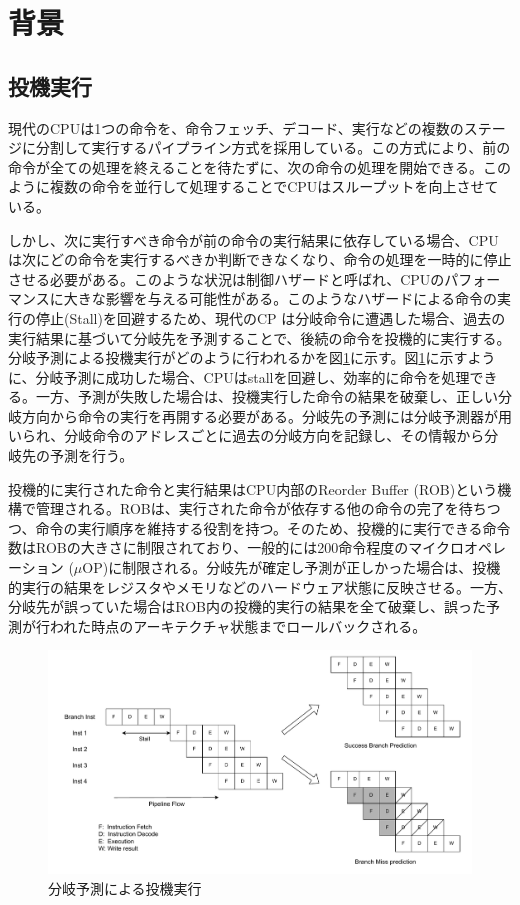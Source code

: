 \section{背景}
\subsection{投機実行}
\label{sec:spec_exec}

現代のCPUは1つの命令を、命令フェッチ、デコード、実行などの複数のステージに分割して実行するパイプライン方式を採用している。この方式により、前の命令が全ての処理を終えることを待たずに、次の命令の処理を開始できる。このように複数の命令を並行して処理することでCPUはスループットを向上させている。\par
しかし、次に実行すべき命令が前の命令の実行結果に依存している場合、CPU は次にどの命令を実行するべきか判断できなくなり、命令の処理を一時的に停止させる必要がある。このような状況は制御ハザードと呼ばれ、CPUのパフォーマンスに大きな影響を与える可能性がある。このようなハザードによる命令の実行の停止(Stall)を回避するため、現代のCP は分岐命令に遭遇した場合、過去の実行結果に基づいて分岐先を予測することで、後続の命令を投機的に実行する。分岐予測による投機実行がどのように行われるかを図\ref{fig:Speculative_Execution}に示す。図\ref{fig:Speculative_Execution}に示すように、分岐予測に成功した場合、CPUはstallを回避し、効率的に命令を処理できる。一方、予測が失敗した場合は、投機実行した命令の結果を破棄し、正しい分岐方向から命令の実行を再開する必要がある。分岐先の予測には分岐予測器が用いられ、分岐命令のアドレスごとに過去の分岐方向を記録し、その情報から分岐先の予測を行う。\par
投機的に実行された命令と実行結果はCPU内部のReorder Buffer (ROB)という機構で管理される。ROBは、実行された命令が依存する他の命令の完了を待ちつつ、命令の実行順序を維持する役割を持つ。そのため、投機的に実行できる命令数はROBの大きさに制限されており、一般的には200命令程度のマイクロオペレーション ($\mu$OP)に制限される。分岐先が確定し予測が正しかった場合は、投機的実行の結果をレジスタやメモリなどのハードウェア状態に反映させる。一方、分岐先が誤っていた場合はROB内の投機的実行の結果を全て破棄し、誤った予測が行われた時点のアーキテクチャ状態までロールバックされる。\par

\begin{figure}[tb]
  \centering
  \includegraphics[width=\linewidth]{img/Speculative_Execution.drawio.pdf}
  \caption{分岐予測による投機実行}\label{fig:Speculative_Execution}
\end{figure}


